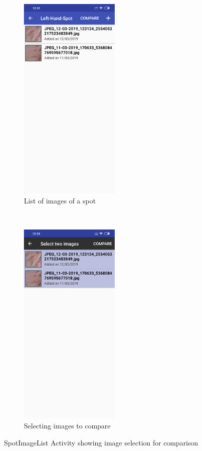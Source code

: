 \begin{figure}[t!]
    \centering
    \begin{subfigure}[t]{0.5\textwidth}
        \centering
        \includegraphics[height=10cm]{figures/spothistory2_android.png}
        \caption{List of images of a spot}
        \label{subfig:spotimagelist}
    \end{subfigure}%
    ~
    \begin{subfigure}[t]{0.5\textwidth}
        \centering
        \includegraphics[height=10cm]{figures/compare1_android.png}
        \caption{Selecting images to compare}
        \label{subfig:spotimagelistcontext}
    \end{subfigure}
    \caption{SpotImageList Activity showing image selection for comparison}
\end{figure}

